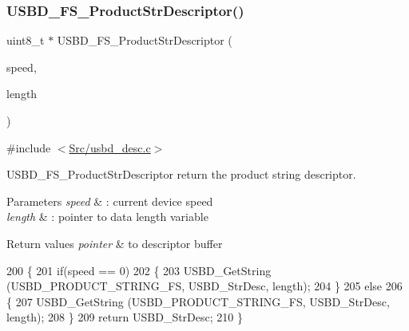 \subsubsection{\texorpdfstring{U\+S\+B\+D\+\_\+\+F\+S\+\_\+\+Product\+Str\+Descriptor()}{USBD\_FS\_ProductStrDescriptor()}}
{\footnotesize\ttfamily uint8\+\_\+t $\ast$ U\+S\+B\+D\+\_\+\+F\+S\+\_\+\+Product\+Str\+Descriptor (\begin{DoxyParamCaption}\item[{U\+S\+B\+D\+\_\+\+Speed\+Type\+Def}]{speed,  }\item[{uint16\+\_\+t $\ast$}]{length }\end{DoxyParamCaption})}



{\ttfamily \#include $<$\mbox{\hyperlink{usbd__desc_8c}{Src/usbd\+\_\+desc.\+c}}$>$}



U\+S\+B\+D\+\_\+\+F\+S\+\_\+\+Product\+Str\+Descriptor return the product string descriptor. 


\begin{DoxyParams}{Parameters}
{\em speed} & \+: current device speed \\
\hline
{\em length} & \+: pointer to data length variable \\
\hline
\end{DoxyParams}

\begin{DoxyRetVals}{Return values}
{\em pointer} & to descriptor buffer \\
\hline
\end{DoxyRetVals}

\begin{DoxyCode}
200 \{
201   \textcolor{keywordflow}{if}(speed == 0)
202   \{   
203     USBD\_GetString (USBD\_PRODUCT\_STRING\_FS, USBD\_StrDesc, length);
204   \}
205   \textcolor{keywordflow}{else}
206   \{
207     USBD\_GetString (USBD\_PRODUCT\_STRING\_FS, USBD\_StrDesc, length);    
208   \}
209   \textcolor{keywordflow}{return} USBD\_StrDesc;
210 \}
\end{DoxyCode}
\mbox{\label{group___u_s_b_d___d_e_s_c___private___functions_gaad2a1d1451821845eda602a82b1cd213}} 
